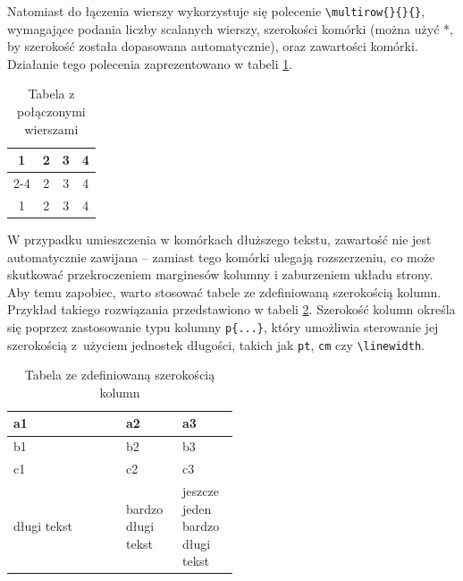\documentclass[12pt,a4paper,twoside]{report}
\theoremstyle{definition} %
\begin{document}
Natomiast do łączenia wierszy wykorzystuje się polecenie \verb|\multirow{}{}{}|, wymagające podania liczby scalanych wierszy, szerokości komórki (można użyć *, by szerokość została dopasowana automatycznie), oraz zawartości komórki. Działanie tego polecenia zaprezentowano w tabeli \ref{laczenie wierszy}.
	
	\begin{table}[h!]
		\begin{center}
            \caption{Tabela z połączonymi wierszami}
			\begin{tabular}{|c|c|c|c|}
				\hline
				\multirow{2}{*}{1} & 2& 3& 4\\ \cline{2-4}
				& 2& 3 & 4 \\ \hline
				1& 2& 3& 4\\ \hline	
			\end{tabular}
			\label{laczenie wierszy}
		\end{center}
	\end{table}
	

    
    W przypadku umieszczenia w komórkach dłuższego tekstu, zawartość nie jest automatycznie zawijana – zamiast tego komórki ulegają rozszerzeniu, co może skutkować przekroczeniem marginesów kolumny i zaburzeniem układu strony. Aby temu zapobiec, warto stosować tabele ze zdefiniowaną szerokością kolumn. Przykład takiego rozwiązania przedstawiono w tabeli \ref{tab:szerokosc-kolumn}. Szerokość kolumn określa się poprzez zastosowanie typu kolumny \texttt{p\{...\}}, który umożliwia sterowanie jej szerokością z~użyciem jednostek długości, takich jak \texttt{pt}, \texttt{cm} czy \verb|\linewidth|.

\newpage
    \begin{table}
    \begin{center}
        \caption{Tabela ze zdefiniowaną szerokością kolumn}
	\begin{tabular}{|lp{0.25\linewidth}|
			p{0.25\linewidth}|}
		
		\hline
		a1 & a2 & a3\\
		\hline
		b1 & b2 & b3\\
		c1 & c2 & c3\\
		\hline
		\hline
		długi tekst &
		bardzo długi tekst &
		jeszcze jeden bardzo długi tekst\\
		\hline
	\end{tabular}
        \label{tab:szerokosc-kolumn}
    \end{center}
    \end{table}
	
\end{document}
